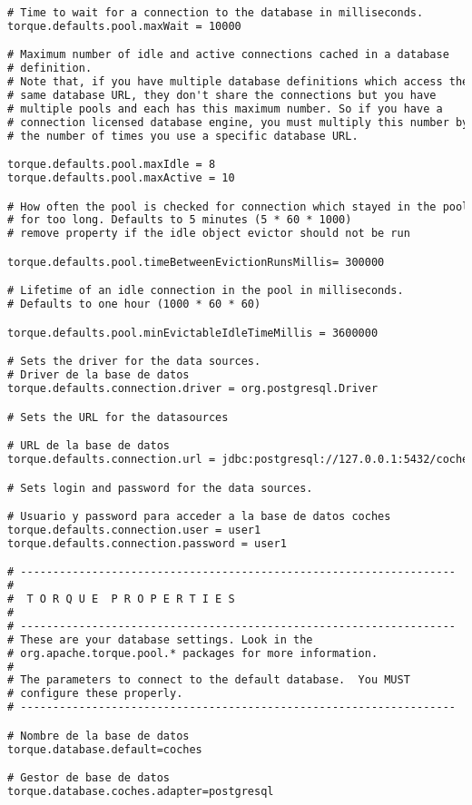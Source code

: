 \begin{lstlisting}[language=xml]
# Time to wait for a connection to the database in milliseconds.
torque.defaults.pool.maxWait = 10000

# Maximum number of idle and active connections cached in a database
# definition.
# Note that, if you have multiple database definitions which access the
# same database URL, they don't share the connections but you have
# multiple pools and each has this maximum number. So if you have a
# connection licensed database engine, you must multiply this number by
# the number of times you use a specific database URL.

torque.defaults.pool.maxIdle = 8
torque.defaults.pool.maxActive = 10

# How often the pool is checked for connection which stayed in the pool
# for too long. Defaults to 5 minutes (5 * 60 * 1000)
# remove property if the idle object evictor should not be run

torque.defaults.pool.timeBetweenEvictionRunsMillis= 300000

# Lifetime of an idle connection in the pool in milliseconds.
# Defaults to one hour (1000 * 60 * 60)

torque.defaults.pool.minEvictableIdleTimeMillis = 3600000

# Sets the driver for the data sources.
# Driver de la base de datos
torque.defaults.connection.driver = org.postgresql.Driver

# Sets the URL for the datasources

# URL de la base de datos
torque.defaults.connection.url = jdbc:postgresql://127.0.0.1:5432/coches

# Sets login and password for the data sources.

# Usuario y password para acceder a la base de datos coches
torque.defaults.connection.user = user1
torque.defaults.connection.password = user1

# -------------------------------------------------------------------
#
#  T O R Q U E  P R O P E R T I E S
#
# -------------------------------------------------------------------
# These are your database settings. Look in the
# org.apache.torque.pool.* packages for more information.
#
# The parameters to connect to the default database.  You MUST
# configure these properly.
# -------------------------------------------------------------------

# Nombre de la base de datos
torque.database.default=coches

# Gestor de base de datos
torque.database.coches.adapter=postgresql


\end{lstlisting}
